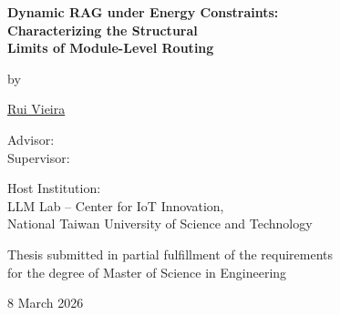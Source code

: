 

\pagestyle{empty}


\begin{titlepage}

\centering

{\large \univname}

\vfill

{\Huge \bfseries Dynamic RAG under Energy Constraints: \\
Characterizing the Structural\\ \vspace{0.2cm}
Limits of Module-Level Routing}

{\large\itshape \tcontext}

\vspace{0.5cm}

{\normalsize by}

\vspace{0.5cm}

{\large \href{mailto:vieirrui@students.zhaw.ch}{Rui Vieira}}

\vfill

{\normalsize Advisor: \supnameA\\Supervisor: \supnameB}

\vspace{0.5cm}

{\normalsize Host Institution:\\
LLM Lab -- Center for IoT Innovation, \\
National Taiwan University of Science and Technology}

\vfill

\begin{minipage}{0.6\textwidth}
  \centering\small
  Thesis submitted in partial fulfillment of the requirements\\
  for the degree of Master of Science in Engineering
\end{minipage}

\vspace{0.5cm}

{\normalsize
  8 March 2026
}

\restoregeometry
\end{titlepage}

